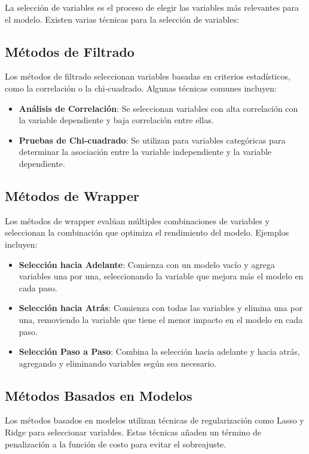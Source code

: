 \documentclass[a4paper]{report} %
\begin{document}
La selecci\'on de variables es el proceso de elegir las variables m\'as relevantes para el modelo. Existen varias t\'ecnicas para la selecci\'on de variables:

\subsection{M\'etodos de Filtrado}

Los m\'etodos de filtrado seleccionan variables basadas en criterios estad\'isticos, como la correlaci\'on o la chi-cuadrado. Algunas t\'ecnicas comunes incluyen:
\begin{itemize}
    \item \textbf{An\'alisis de Correlaci\'on}: Se seleccionan variables con alta correlaci\'on con la variable dependiente y baja correlaci\'on entre ellas.
    \item \textbf{Pruebas de Chi-cuadrado}: Se utilizan para variables categ\'oricas para determinar la asociaci\'on entre la variable independiente y la variable dependiente.
\end{itemize}

\subsection{M\'etodos de Wrapper}

Los m\'etodos de wrapper eval\'uan m\'ultiples combinaciones de variables y seleccionan la combinaci\'on que optimiza el rendimiento del modelo. Ejemplos incluyen:
\begin{itemize}
    \item \textbf{Selecci\'on hacia Adelante}: Comienza con un modelo vac\'io y agrega variables una por una, seleccionando la variable que mejora m\'as el modelo en cada paso.
    \item \textbf{Selecci\'on hacia Atr\'as}: Comienza con todas las variables y elimina una por una, removiendo la variable que tiene el menor impacto en el modelo en cada paso.
    \item \textbf{Selecci\'on Paso a Paso}: Combina la selecci\'on hacia adelante y hacia atr\'as, agregando y eliminando variables seg\'un sea necesario.
\end{itemize}

\subsection{M\'etodos Basados en Modelos}

Los m\'etodos basados en modelos utilizan t\'ecnicas de regularizaci\'on como Lasso y Ridge para seleccionar variables. Estas t\'ecnicas a\~naden un t\'ermino de penalizaci\'on a la funci\'on de costo para evitar el sobreajuste.
\end{document}
